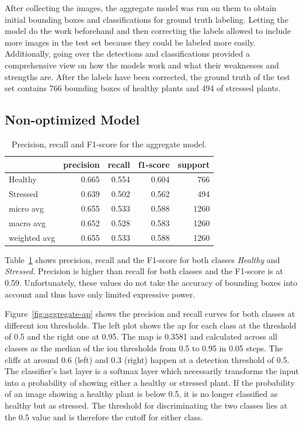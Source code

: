 \documentclass[draft,final]{vutinfth} %
\begin{document}
After collecting the images, the aggregate model was run on them to
obtain initial bounding boxes and classifications for ground truth
labeling. Letting the model do the work beforehand and then correcting
the labels allowed to include more images in the test set because they
could be labeled more easily. Additionally, going over the detections
and classifications provided a comprehensive view on how the models
work and what their weaknesses and strengths are. After the labels
have been corrected, the ground truth of the test set contains 766
bounding boxes of healthy plants and 494 of stressed plants.

\subsection{Non-optimized Model}
\label{ssec:model-non-optimized}

\begin{table}
  \centering
  \begin{tabular}{lrrrr}
    \toprule
    {} &  precision &  recall &  f1-score &  support \\
    \midrule
    Healthy      &      0.665 &   0.554 &     0.604 &    766 \\
    Stressed     &      0.639 &   0.502 &     0.562 &    494 \\
    micro avg    &      0.655 &   0.533 &     0.588 &   1260 \\
    macro avg    &      0.652 &   0.528 &     0.583 &   1260 \\
    weighted avg &      0.655 &   0.533 &     0.588 &   1260 \\
    \bottomrule
  \end{tabular}
  \caption{Precision, recall and F1-score for the aggregate model.}
  \label{tab:model-metrics}
\end{table}

Table~\ref{tab:model-metrics} shows precision, recall and the F1-score
for both classes \emph{Healthy} and \emph{Stressed}. Precision is
higher than recall for both classes and the F1-score is at
0.59. Unfortunately, these values do not take the accuracy of bounding
boxes into account and thus have only limited expressive power.

Figure~\ref{fig:aggregate-ap} shows the precision and recall curves
for both classes at different \gls{iou} thresholds. The left plot
shows the \gls{ap} for each class at the threshold of 0.5 and the
right one at 0.95. The \gls{map} is 0.3581 and calculated across all
classes as the median of the \gls{iou} thresholds from 0.5 to 0.95 in
0.05 steps. The cliffs at around 0.6 (left) and 0.3 (right) happen at
a detection threshold of 0.5. The classifier's last layer is a softmax
layer which necessarily transforms the input into a probability of
showing either a healthy or stressed plant. If the probability of an
image showing a healthy plant is below 0.5, it is no longer classified
as healthy but as stressed. The threshold for discriminating the two
classes lies at the 0.5 value and is therefore the cutoff for either
class.
\end{document}
